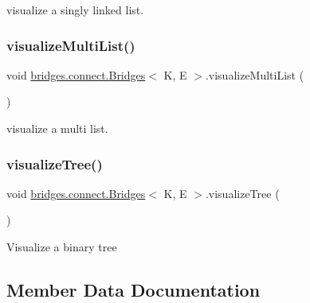 visualize a singly linked list. \hypertarget{classbridges_1_1connect_1_1_bridges_af3b189a5b95710e3bc3685e85572478f}{}\label{classbridges_1_1connect_1_1_bridges_af3b189a5b95710e3bc3685e85572478f} 
\subsubsection{\texorpdfstring{visualize\+Multi\+List()}{visualizeMultiList()}}
{\footnotesize\ttfamily void \hyperlink{classbridges_1_1connect_1_1_bridges}{bridges.\+connect.\+Bridges}$<$ K, E $>$.visualize\+Multi\+List (\begin{DoxyParamCaption}{ }\end{DoxyParamCaption})\hspace{0.3cm}{\ttfamily [protected]}}

visualize a multi list. \hypertarget{classbridges_1_1connect_1_1_bridges_abd8fa1ef8d6c5d3e6c533ee069d24d85}{}\label{classbridges_1_1connect_1_1_bridges_abd8fa1ef8d6c5d3e6c533ee069d24d85} 
\subsubsection{\texorpdfstring{visualize\+Tree()}{visualizeTree()}}
{\footnotesize\ttfamily void \hyperlink{classbridges_1_1connect_1_1_bridges}{bridges.\+connect.\+Bridges}$<$ K, E $>$.visualize\+Tree (\begin{DoxyParamCaption}{ }\end{DoxyParamCaption})\hspace{0.3cm}{\ttfamily [protected]}}

Visualize a binary tree 

\subsection{Member Data Documentation}
\hypertarget{classbridges_1_1connect_1_1_bridges_af3fc35779b31c976ed8bf2e173310502}{}\label{classbridges_1_1connect_1_1_bridges_af3fc35779b31c976ed8bf2e173310502} 
